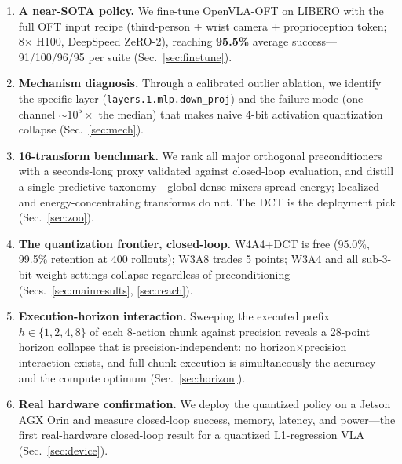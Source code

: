 \documentclass[conference]{IEEEtran}
\begin{document}
\begin{enumerate}
  \item \textbf{A near-SOTA policy.} We fine-tune OpenVLA-OFT on LIBERO with the full OFT
        input recipe (third-person $+$ wrist camera $+$ proprioception token; 8$\times$
        H100, DeepSpeed ZeRO-2), reaching \textbf{95.5\%} average success---91/100/96/95
        per suite (Sec.~\ref{sec:finetune}).

  \item \textbf{Mechanism diagnosis.} Through a calibrated outlier ablation, we identify
        the specific layer (\texttt{layers.1.mlp.down\_proj}) and the failure mode
        (one channel $\sim\!10^5\times$ the median) that makes naive 4-bit activation
        quantization collapse (Sec.~\ref{sec:mech}).

  \item \textbf{16-transform benchmark.} We rank all major orthogonal preconditioners
        with a seconds-long proxy validated against closed-loop evaluation, and distill a
        single predictive taxonomy---global dense mixers spread energy; localized and
        energy-concentrating transforms do not. The DCT is the deployment pick
        (Sec.~\ref{sec:zoo}).

  \item \textbf{The quantization frontier, closed-loop.} W4A4+DCT is free (95.0\%, 99.5\%
        retention at 400 rollouts); W3A8 trades 5 points; W3A4 and all sub-3-bit weight
        settings collapse regardless of preconditioning (Secs.~\ref{sec:mainresults},
        \ref{sec:reach}).

  \item \textbf{Execution-horizon interaction.} Sweeping the executed prefix
        $h\in\{1,2,4,8\}$ of each 8-action chunk against precision reveals a 28-point
        horizon collapse that is precision-independent: no horizon$\times$precision
        interaction exists, and full-chunk execution is simultaneously the accuracy and
        the compute optimum (Sec.~\ref{sec:horizon}).

  \item \textbf{Real hardware confirmation.} We deploy the quantized policy on a Jetson
        AGX Orin and measure closed-loop success, memory, latency, and power---the first
        real-hardware closed-loop result for a quantized L1-regression VLA
        (Sec.~\ref{sec:device}).
\end{enumerate}

\end{document}
